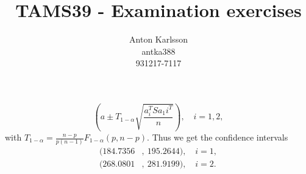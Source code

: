 \message{ !name(examination.tex)}\documentclass[two column]{article}
\title{TAMS39 - Examination exercises}
\author{Anton Karlsson\\antka388\\931217-7117}
\date{}
\begin{document}
\begin{equation*}
  \left(
    a \pm T_{1-\alpha} \sqrt{\frac{a_i^T S a_1i^T}{n}}
  \right), \quad i = 1,2,
\end{equation*}
with $T_{1-\alpha} = \frac{n-p}{p(n-1)}F_{1-\alpha}(p, n-p)$. Thus we
get the confidence intervals
\begin{align*}
  (184.7356&,\ 195.2644),\quad i = 1, \\
  (268.0801&,\ 281.9199),\quad i = 2.
\end{align*}
\end{document}
